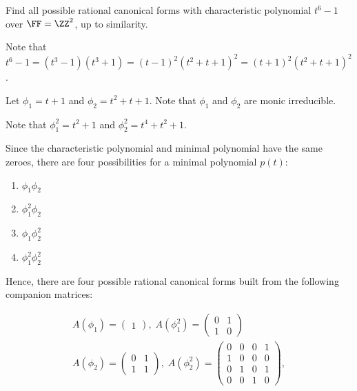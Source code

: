 \documentclass[11pt]{scrartcl}
\begin{document}
\begin{problem*}
  \hfill
Find all possible rational canonical forms with characteristic polynomial $t^6-1$ over $\FF = \ZZ^2$, up to similarity.
\end{problem*}

\begin{soln}
  \hfill

  Note that
  $t^6-1 = (t^3-1)(t^3+1) = (t-1)^2(t^2+t+1)^2 = (t+1)^2(t^2+t+1)^2$.

  Let $\phi_1 = t+1$ and $\phi_2=t^2+t+1$. Note that $\phi_1$ and
  $\phi_2$ are monic irreducible.

Note that $\phi^2_1 = t^2+1$ and $\phi_2^2=  t^4+t^2+1$.

  Since the characteristic polynomial and minimal polynomial have the
  same zeroes, there are four possibilities for a minimal polynomial $p(t)$:
  \begin{enumerate}
  \item $\phi_1 \phi_2$
  \item $\phi_1^2\phi_2$
  \item $\phi_1\phi_2^2$
  \item $\phi_1^2\phi_2^2$
  \end{enumerate}
  Hence, there are four possible rational canonical forms built from
  the following companion matrices:

  \begin{align}
    A(\phi_1) = \begin{pmatrix}
      1
    \end{pmatrix}, \; 
A(\phi_1^2) = 
          \begin{pmatrix}
            0 & 1\\
            1 & 0
          \end{pmatrix}\\
A(\phi_2) = 
    \begin{pmatrix}
      0 & 1\\
      1 & 1
    \end{pmatrix}, \;
A(\phi_2^2) = 
          \begin{pmatrix}
            0 & 0 & 0 & 1\\
            1 & 0 & 0 & 0\\
            0 & 1 & 0 & 1\\
            0 & 0 & 1 & 0
          \end{pmatrix},
  \end{align}


\end{soln}
\end{document}
